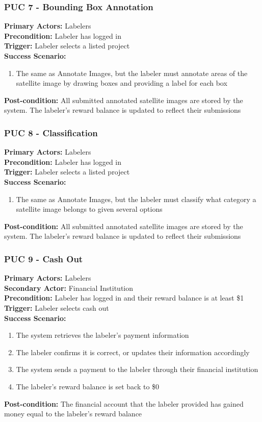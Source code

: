 \documentclass[12pt]{article}
\begin{document}
\subsubsection{PUC 7 - Bounding Box Annotation}
\textbf{Primary Actors:} Labelers\\ 
\textbf{Precondition:} Labeler has logged in\\
\textbf{Trigger:} Labeler selects a listed project\\
\textbf{Success Scenario:}
\begin{enumerate}
    \item The same as Annotate Images, but the labeler must annotate areas of the satellite image by drawing boxes and providing a label for each box
\end{enumerate}
\textbf{Post-condition:} All submitted annotated satellite images are stored by the system. The labeler's reward balance is updated to reflect their submissions

\subsubsection{PUC 8 - Classification}
\textbf{Primary Actors:} Labelers\\ 
\textbf{Precondition:} Labeler has logged in\\
\textbf{Trigger:} Labeler selects a listed project\\
\textbf{Success Scenario:}
\begin{enumerate}
    \item The same as Annotate Images, but the labeler must classify what category a satellite image belongs to given several options
\end{enumerate}
\textbf{Post-condition:} All submitted annotated satellite images are stored by the system. The labeler's reward balance is updated to reflect their submissions

\subsubsection{PUC 9 - Cash Out}
\textbf{Primary Actors:} Labelers\\
\textbf{Secondary Actor:} Financial Institution\\
\textbf{Precondition:} Labeler has logged in and their reward balance is at least \$1\\
\textbf{Trigger:} Labeler selects cash out\\
\textbf{Success Scenario:}
\begin{enumerate}
    \item The system retrieves the labeler's payment information
    \item The labeler confirms it is correct, or updates their information accordingly
    \item The system sends a payment to the labeler through their financial institution
    \item The labeler's reward balance is set back to \$0
\end{enumerate}
\textbf{Post-condition:} The financial account that the labeler provided has gained money equal to the labeler's reward balance
\end{document}
